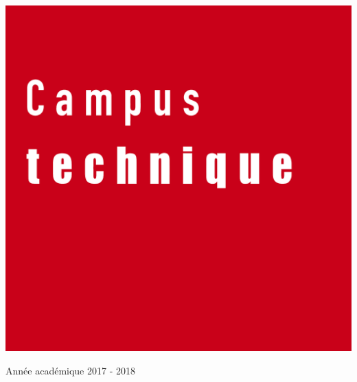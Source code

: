 \begin{center}
  \vspace{1cm}

  \includegraphics[scale=0.08]{textures/logo/technical.pdf}

  \vspace{0.5cm}

  Année académique 2017 - 2018
\end{center}

\thispagestyle{empty}
